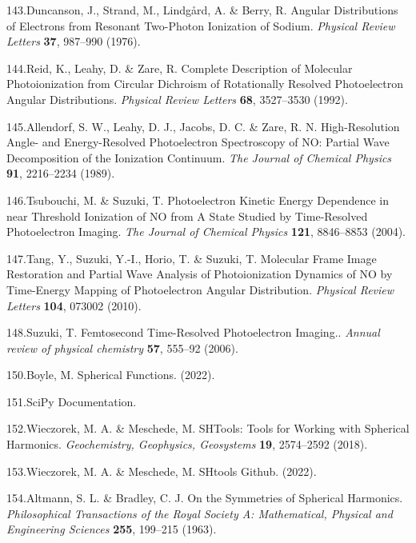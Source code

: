 \documentclass[10pt]{article}
\begin{document}
\label{csl:143}143.Duncanson, J., Strand, M., Lindg{\aa}rd, A. \& Berry, R. {Angular {{Distributions}} of {{Electrons}} from {{Resonant Two}}-{{Photon Ionization}} of {{Sodium}}}. \textit{Physical Review Letters} \textbf{37}, 987–990 (1976).

\label{csl:144}144.Reid, K., Leahy, D. \& Zare, R. {Complete Description of Molecular Photoionization from Circular Dichroism of Rotationally Resolved Photoelectron Angular Distributions}. \textit{Physical Review Letters} \textbf{68}, 3527–3530 (1992).

\label{csl:145}145.Allendorf, S. W., Leahy, D. J., Jacobs, D. C. \& Zare, R. N. {High-Resolution Angle- and Energy-Resolved Photoelectron Spectroscopy of {{NO}}: {{Partial}} Wave Decomposition of the Ionization Continuum}. \textit{The Journal of Chemical Physics} \textbf{91}, 2216–2234 (1989).

\label{csl:146}146.Tsubouchi, M. \& Suzuki, T. {Photoelectron Kinetic Energy Dependence in near Threshold Ionization of {{NO}} from {{A}} State Studied by Time-Resolved Photoelectron Imaging}. \textit{The Journal of Chemical Physics} \textbf{121}, 8846–8853 (2004).

\label{csl:147}147.Tang, Y., Suzuki, Y.-I., Horio, T. \& Suzuki, T. {Molecular {{Frame Image Restoration}} and {{Partial Wave Analysis}} of {{Photoionization Dynamics}} of {{NO}} by {{Time}}-{{Energy Mapping}} of {{Photoelectron Angular Distribution}}}. \textit{Physical Review Letters} \textbf{104}, 073002 (2010).

\label{csl:148}148.Suzuki, T. {Femtosecond Time-Resolved Photoelectron Imaging.}. \textit{Annual review of physical chemistry} \textbf{57}, 555–92 (2006).

\label{csl:150}150.Boyle, M. {Spherical {{Functions}}}. (2022).

\label{csl:151}151.{{{SciPy}} Documentation}.

\label{csl:152}152.Wieczorek, M. A. \& Meschede, M. {{{SHTools}}: {{Tools}} for {{Working}} with {{Spherical Harmonics}}}. \textit{Geochemistry, Geophysics, Geosystems} \textbf{19}, 2574–2592 (2018).

\label{csl:153}153.Wieczorek, M. A. \& Meschede, M. {{SHtools Github}}. (2022).

\label{csl:154}154.Altmann, S. L. \& Bradley, C. J. {On the {{Symmetries}} of {{Spherical Harmonics}}}. \textit{Philosophical Transactions of the Royal Society A: Mathematical, Physical and Engineering Sciences} \textbf{255}, 199–215 (1963).
\end{document}
